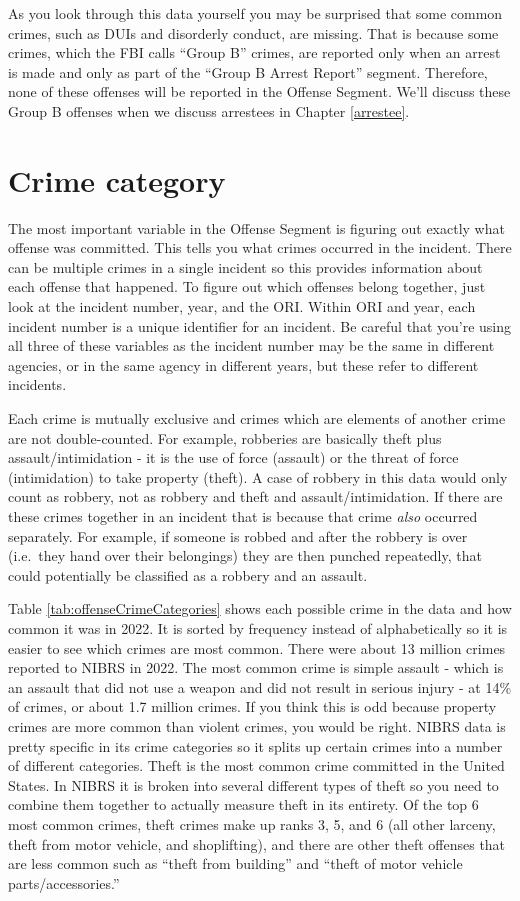 \documentclass[
]{krantz}
\begin{document}
As you look through this data yourself you may be surprised
that some common crimes, such as DUIs and disorderly
conduct, are missing. That is because some crimes, which the
FBI calls ``Group B'' crimes, are reported only when an
arrest is made and only as part of the ``Group B Arrest
Report'' segment. Therefore, none of these offenses will be
reported in the Offense Segment. We'll discuss these Group B
offenses when we discuss arrestees in Chapter
\ref{arrestee}.

\section{Crime category}\label{crime-category}

The most important variable in the Offense Segment is
figuring out exactly what offense was committed. This tells
you what crimes occurred in the incident. There can be
multiple crimes in a single incident so this provides
information about each offense that happened. To figure out
which offenses belong together, just look at the incident
number, year, and the ORI. Within ORI and year, each
incident number is a unique identifier for an incident. Be
careful that you're using all three of these variables as
the incident number may be the same in different agencies,
or in the same agency in different years, but these refer to
different incidents.

Each crime is mutually exclusive and crimes which are
elements of another crime are not double-counted. For
example, robberies are basically theft plus
assault/intimidation - it is the use of force (assault) or
the threat of force (intimidation) to take property (theft).
A case of robbery in this data would only count as robbery,
not as robbery and theft and assault/intimidation. If there
are these crimes together in an incident that is because
that crime \emph{also} occurred separately. For example, if
someone is robbed and after the robbery is over (i.e.~they
hand over their belongings) they are then punched
repeatedly, that could potentially be classified as a
robbery and an assault.

Table \ref{tab:offenseCrimeCategories} shows each possible
crime in the data and how common it was in 2022. It is
sorted by frequency instead of alphabetically so it is
easier to see which crimes are most common. There were about
13 million crimes reported to NIBRS in 2022. The most common
crime is simple assault - which is an assault that did not
use a weapon and did not result in serious injury - at 14\%
of crimes, or about 1.7 million crimes. If you think this is
odd because property crimes are more common than violent
crimes, you would be right. NIBRS data is pretty specific in
its crime categories so it splits up certain crimes into a
number of different categories. Theft is the most common
crime committed in the United States. In NIBRS it is broken
into several different types of theft so you need to combine
them together to actually measure theft in its entirety. Of
the top 6 most common crimes, theft crimes make up ranks 3,
5, and 6 (all other larceny, theft from motor vehicle, and
shoplifting), and there are other theft offenses that are
less common such as ``theft from building'' and ``theft of
motor vehicle parts/accessories.''
\end{document}
